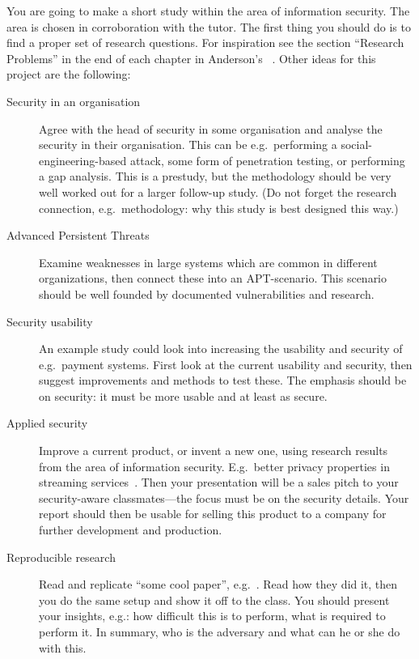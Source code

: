 \documentclass[a4paper]{llncs}
\begin{document}
You are going to make a short study within the area of information security.
The area is chosen in corroboration with the tutor.
The first thing you should do is to find a proper set of research questions.
For inspiration see the section \enquote{Research Problems} in the end of each 
chapter in Anderson's ~\cite{Anderson2008sea}.
Other ideas for this project are the following:
\begin{description}
  \item[Security in an organisation]
    Agree with the head of security in some organisation and analyse the 
    security in their organisation.
    This can be e.g.~performing a social-engineering-based attack, some form of 
    penetration testing, or performing a gap analysis.
    This is a prestudy, but the methodology should be very well worked out for 
    a larger follow-up study.
    (Do not forget the research connection, e.g.~methodology: why this study is 
    best designed this way.)

  \item[Advanced Persistent Threats]
    Examine weaknesses in large systems which are common in different 
    organizations, then connect these into an APT-scenario.
    This scenario should be well founded by documented vulnerabilities and 
    research.

  \item[Security usability]
    An example study could look into increasing the usability and security of 
    e.g.~payment systems.
    First look at the current usability and security, then suggest improvements 
    and methods to test these.
    The emphasis should be on security: it must be more usable and at least as 
    secure.

  \item[Applied security]
    Improve a current product, or invent a new one, using research results from 
    the area of information security.
    E.g.~better privacy properties in streaming services~\cite{anonpass}.
    Then your presentation will be a sales pitch to your security-aware 
    classmates---the focus must be on the security details.
    Your report should then be usable for selling this product to a company for 
    further development and production.

  \item[Reproducible research]
    Read and replicate \enquote{some cool paper}, e.g.~\cite{acoustic}.
    Read how they did it, then you do the same setup and show it off to the 
    class.
    You should present your insights, e.g.:
    how difficult this is to perform,
    what is required to perform it.
    In summary, who is the adversary and what can he or she do with this.
\end{description}
\end{document}
